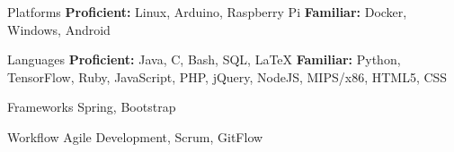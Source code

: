 
\vspace{0mm}
\begin{cvskills}

  \vspace{0mm}


  \cvskill
    {Platforms} %
    {\textbf{Proficient:} Linux, Arduino, Raspberry Pi \newline \textbf{Familiar:} Docker, Windows, Android} %

  \vspace{0mm}
  
  \cvskill
    {Languages} %
    {\textbf{Proficient:} Java, C, Bash, SQL, LaTeX \newline \textbf{Familiar:} Python, TensorFlow, Ruby, JavaScript, PHP, jQuery, NodeJS, MIPS/x86, HTML5, CSS} %

  \vspace{0mm}

  \cvskill
    {Frameworks} %
    {Spring, Bootstrap} %

  \vspace{0mm}

  \cvskill
    {Workflow} %
    {Agile Development, Scrum, GitFlow} %

\end{cvskills}